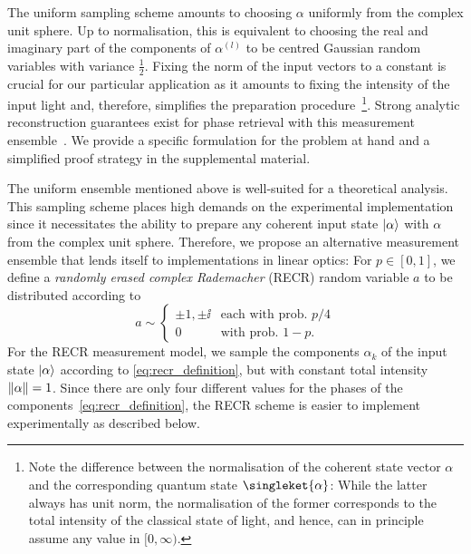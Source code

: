The uniform sampling scheme amounts to choosing $ \alpha$ uniformly from the complex unit sphere.
Up to normalisation, this is equivalent to choosing the real and imaginary part of the components of $\alpha^{(l)}$ to be centred Gaussian random variables with variance $\tfrac{1}{2}$.
Fixing the norm of the input vectors to a constant is crucial for our particular application as it amounts to fixing the intensity of the input light and, therefore, simplifies the preparation procedure~\footnote{%
  Note the difference between the normalisation of the coherent state vector $\alpha$ and the corresponding quantum state $\singleket{\alpha}$:
  While the latter always has unit norm, the normalisation of the former corresponds to the total intensity of the classical state of light, and hence, can in principle assume any value in $[0,\infty)$.
}.
Strong analytic reconstruction guarantees exist for phase retrieval with this measurement ensemble~\cite{candes_solving_2012, tropp_convex_2015, kueng_low_2014}.
We provide a specific formulation for the problem at hand and a simplified proof strategy in the supplemental material.

The uniform ensemble mentioned above is well-suited for a theoretical analysis.
This sampling scheme places high demands on the experimental implementation since it necessitates the ability to prepare any coherent input state $\ket{ \alpha}$ with $\alpha$ from the complex unit sphere.
Therefore, we propose an alternative measurement ensemble that lends itself to implementations in linear optics:
For $p \in [0,1]$, we define a \emph{randomly erased complex Rademacher} (RECR) random variable $a$ to be distributed according to
\begin{equation}
  a \sim
  \begin{cases}
    \pm 1, \pm \ii & \textrm{each with prob. } p/4 \\
    0 & \textrm{with prob. } 1 - p.
  \end{cases}
  \label{eq:recr_definition}
\end{equation}
For the RECR measurement model, we sample the components $\alpha_k$ of the input state $\ket{ \alpha}$ according to \cref{eq:recr_definition}, but with constant total intensity ${\Vert\alpha\Vert} = 1$.
Since there are only four different values for the phases of the components~\eqref{eq:recr_definition}, the RECR scheme is easier to implement experimentally as described below.


